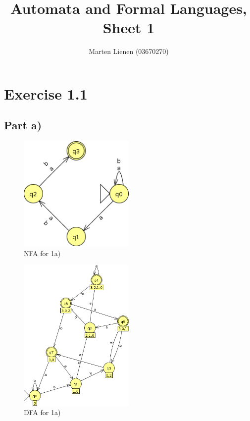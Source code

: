 \documentclass[10pt,a4paper]{article}
\title{Automata and Formal Languages, Sheet 1}
\author{Marten Lienen (03670270)}
\begin{document}
\maketitle

\section*{Exercise 1.1}

\subsection*{Part a)}

\begin{figure}[h]
  \centering
  \includegraphics[width=0.5\textwidth]{sheet-1/exercise-1-a-nfa}
  \caption{NFA for 1a)}
\end{figure}

\begin{figure}[h]
  \centering
  \includegraphics[width=0.5\textwidth]{sheet-1/exercise-1-a-dfa}
  \caption{DFA for 1a)}
\end{figure}
\end{document}
